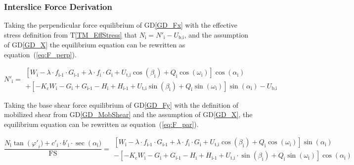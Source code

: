 \documentclass[12pt]{article}
\newcommand{\tref}[1]{T\ref{#1}}
\newcommand{\dref}[1]{GD\ref{#1}}
\begin{document}
\subsubsection*{Interslice Force Derivation} \label{sec:Ederivation}

Taking the perpendicular force equilibrium of \dref{GD_Fx} with the
effective stress definition from \tref{TM_EffStress} that
$N_{\text{i}}=N'_{\text{i}} - U_{\text{b,i}}$, and the assumption of
\dref{GD_X} the equilibrium equation can be rewritten as
equation~(\ref{eq:F_perp}).

\begin{equation}\label{eq:F_perp}   N'_{\text{i}}  = \begin{array}{l}    
    \left[ W_{\text{i}} - \lambda \cdot f_{\text{i-1}} \cdot
      G_{\text{i-1}} + \lambda \cdot f_{\text{i}} \cdot G_{\text{i}} +
      U_{\text{t,i}} {\cos\left(\beta_{\text{i}}\right)} +
      Q_{\text{i}} \cos\left(\omega_{\text{i}}\right)
      \right]\cos\left(\alpha_{\text{i}}\right) \\ + \left[
      -K_{\text{c}} W_{\text{i}} - G_{\text{i}} + G_{\text{i-1}} -
      H_{\text{i}} + H_{\text{i-1}} + U_{\text{t,i}}
      \sin\left(\beta_{\text{i}}\right) + Q_{\text{i}}
      \sin\left(\omega_{\text{i}}\right) \right]
    \sin\left(\alpha_{\text{i}}\right) - U_{\text{b,i}} \end{array}
\end{equation}

\noindent
Taking the base shear force equilibrium of \dref{GD_Fy} with the
definition of mobilized shear from \dref{GD_MobShear} and the assumption
of \dref{GD_X}, the equilibrium equation can be rewritten as
equation~(\ref{eq:F_par}).


\begin{equation}  \label{eq:F_par}
  \frac{
   N_{\text{i}} \tan\left(\varphi'\right._{i}) + c'_{\text{i}} \cdot 
   b'_{\text{i}} \cdot \sec\left(\alpha_{\text{i}}\right.) 
  }
    { \text{FS} }
     = \begin{array}{l}
      \left[ W_{\text{i}}
       - \lambda \cdot
    
      f_{\text{i-1}} \cdot G_{\text{i-1}} + \lambda \cdot f_{\text{i}}
      \cdot G_{\text{i}} + U_{\text{t,i}}
      \cos\left(\beta_{\text{i}}\right) + Q_{\text{i}}
      \cos\left(\omega_{\text{i}}\right) \right]
    \sin\left(\alpha_{\text{i}}\right) \\ - \left[ -K_{\text{c}}
      W_{\text{i}} - G_{\text{i}} + G_{\text{i-1}} - H_{\text{i}} +
      H_{\text{i-1}} + U_{\text{t,i}} \cdot
      \sin\left(\beta_{\text{i}}\right) + Q_{\text{i}}
      \sin\left(\omega_{\text{i}}\right) \right]
    \cos\left(\alpha_{\text{i}}\right) \end{array}
\end{equation}
\end{document}
